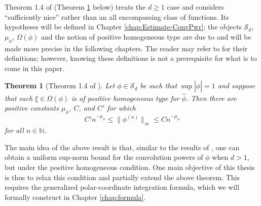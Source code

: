 \documentclass[11pt, letter]{book}
\newtheorem{theorem}{Theorem}[section]
\begin{document}
\noindent Theorem 1.4 of \cite{randles_convolution_2017} (Theorem \ref{thm:d} below) treats the $d\geq 1$ case and considers ``sufficiently nice'' rather than an all encompassing class of functions. Its hypotheses will be defined in Chapter \ref{chap:Estimate-ConvPwr}; the objects $\mathcal{S}_d$, $\mu_\phi$, $\Omega(\phi)$ and the notion of positive homogeneous type are due to \cite{randles_convolution_2017} and will be made more precise in the following chapters. The reader may refer to \cite{randles_convolution_2017} for their definitions; however, knowing these definitions is not a prerequisite for what is to come in this paper.

\begin{framed}
\begin{theorem}[Theorem 1.4 of \cite{randles_convolution_2017}]\label{thm:d}
Let $\phi \in \mathcal{S}_d$ be such that $\sup |\widehat{\phi}| = 1$ and suppose that each $\xi \in \Omega(\phi)$ is of positive homogeneous type for $\widehat{\phi}$. Then there are positive constants $\mu_\phi$, $C$, and $C'$ for which 
\begin{equation*}
    C'n^{-\mu_\phi} \leq \| \phi^{(n)} \|_\infty \leq C n^{-\mu_\phi}
\end{equation*}
for all $n\in \mathbb{N}$.
\end{theorem}
\end{framed}

\noindent The main idea of the above result is that, similar to the results of \cite{randles_convolution_2015}, one can obtain a uniform sup-norm bound for the convolution powers of $\phi$ when $d>1$, but under the positive homogeneous condition. One main objective of this thesis is thus to relax this condition and partially extend the above theorem. This requires the generalized polar-coordinate integration formula, which we will formally construct in Chapter \ref{chap:formula}. 
\end{document}
